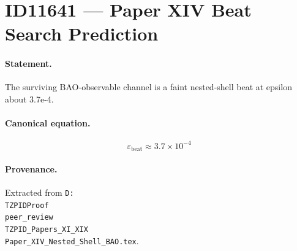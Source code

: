 \section*{ID11641 --- Paper XIV Beat Search Prediction}

\paragraph{Statement.}
The surviving BAO-observable channel is a faint nested-shell beat at epsilon about 3.7e-4.

\paragraph{Canonical equation.}
\[
\varepsilon_{\mathrm{beat}}\approx3.7\times10^{-4}
\]

\paragraph{Provenance.}
Extracted from \texttt{D:\\TZPIDProof\\peer\_review\\TZPID\_Papers\_XI\_XIX\\Paper\_XIV\_Nested\_Shell\_BAO.tex}.

